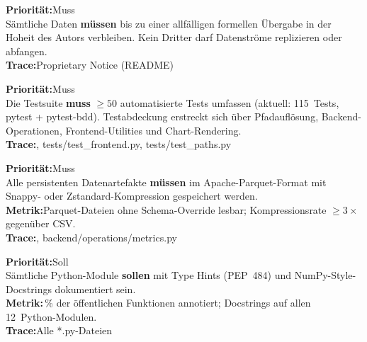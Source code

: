 \documentclass[11pt, a4paper, oneside, openany]{report}
\newcommand{\code}[1]{{\codefont\small\textcolor{DeepNavy}{#1}}}
\begin{document}
\vspace{6pt}

\begin{reqbox}
\textbf{Priorität:}\;Muss \\[4pt]
Sämtliche Daten \textbf{müssen} bis zu einer allfälligen formellen Übergabe in der Hoheit des Autors verbleiben. Kein Dritter darf Datenströme replizieren oder abfangen. \\[4pt]
\textbf{Trace:}\;Proprietary Notice (README)
\end{reqbox}

\vspace{6pt}

\begin{reqbox}
\textbf{Priorität:}\;Muss \\[4pt]
Die Testsuite \textbf{muss} $\geq 50$ automatisierte Tests umfassen (aktuell: 115~Tests, pytest + pytest-bdd). Testabdeckung erstreckt sich über Pfadauflösung, Backend-Operationen, Frontend-Utilities und Chart-Rendering. \\[4pt]
\textbf{Trace:}\;\code{tests/test\_backend.py}, \code{tests/test\_frontend.py}, \code{tests/test\_paths.py}
\end{reqbox}

\vspace{6pt}

\begin{reqbox}
\textbf{Priorität:}\;Muss \\[4pt]
Alle persistenten Datenartefakte \textbf{müssen} im Apache-Parquet-Format mit Snappy- oder Zstandard-Kompression gespeichert werden. \\[4pt]
\textbf{Metrik:}\;Parquet-Dateien ohne Schema-Override lesbar; Kompressionsrate $\geq 3\times$ gegenüber CSV. \\[4pt]
\textbf{Trace:}\;\code{backend/operations/build\_master\_parquet.py}, \code{backend/operations/metrics.py}
\end{reqbox}

\vspace{6pt}

\begin{reqbox}
\textbf{Priorität:}\;Soll \\[4pt]
Sämtliche Python-Module \textbf{sollen} mit Type Hints (PEP~484) und NumPy-Style-Docstrings dokumentiert sein. \\[4pt]
\textbf{Metrik:}\,\% der öffentlichen Funktionen annotiert; Docstrings auf allen 12~Python-Modulen. \\[4pt]
\textbf{Trace:}\;Alle \code{*.py}-Dateien
\end{reqbox}
\end{document}
